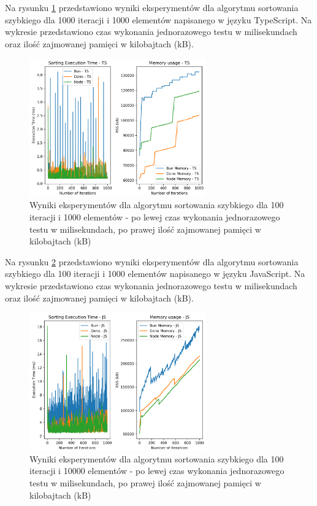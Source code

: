 Na rysunku \ref{fig:quick_sorting_e3_ts} przedstawiono wyniki eksperymentów dla algorytmu sortowania szybkiego dla 1000 iteracji i 1000 elementów napisanego w języku TypeScript. Na wykresie przedstawiono czas wykonania jednorazowego testu w milisekundach oraz ilość zajmowanej pamięci w kilobajtach (kB).

\begin{figure}[H]
  \centering
  \includegraphics[width=0.68\textwidth]{Figures/sorting/sorting_quick_1000_1000_ts.png}
  \caption{Wyniki eksperymentów dla algorytmu sortowania szybkiego dla 100 iteracji i 1000 elementów - po lewej czas wykonania jednorazowego testu w milisekundach, po prawej ilość zajmowanej pamięci w kilobajtach (kB)}
  \label{fig:quick_sorting_e3_ts}
\end{figure}

Na rysunku \ref{fig:quick_sorting_e4} przedstawiono wyniki eksperymentów dla algorytmu sortowania szybkiego dla 100 iteracji i 1000 elementów napisanego w języku JavaScript. Na wykresie przedstawiono czas wykonania jednorazowego testu w milisekundach oraz ilość zajmowanej pamięci w kilobajtach (kB).

\begin{figure}[H]
  \centering
  \includegraphics[width=0.68\textwidth]{Figures/sorting/sorting_quick_1000_10000_js.png}
  \caption{Wyniki eksperymentów dla algorytmu sortowania szybkiego dla 100 iteracji i 10000 elementów - po lewej czas wykonania jednorazowego testu w milisekundach, po prawej ilość zajmowanej pamięci w kilobajtach (kB)}
  \label{fig:quick_sorting_e4}
\end{figure}

